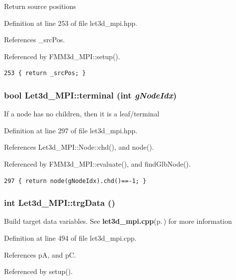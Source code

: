 Return source positions 

Definition at line 253 of file let3d\_\-mpi.hpp.

References \_\-src\-Pos.

Referenced by FMM3d\_\-MPI::setup().

\footnotesize\begin{verbatim}253 { return _srcPos; }
\end{verbatim}\normalsize 


\subsubsection{\setlength{\rightskip}{0pt plus 5cm}bool Let3d\_\-MPI::terminal (int {\em g\-Node\-Idx})\hspace{0.3cm}{\tt  [inline]}}\label{classLet3d__MPI_8bef6e640d1f466fdac02445bb2873ef_8bef6e640d1f466fdac02445bb2873ef}


If a node has no children, then it is a leaf/terminal 

Definition at line 297 of file let3d\_\-mpi.hpp.

References Let3d\_\-MPI::Node::chd(), and node().

Referenced by FMM3d\_\-MPI::evaluate(), and find\-Glb\-Node().

\footnotesize\begin{verbatim}297 { return node(gNodeIdx).chd()==-1; }
\end{verbatim}\normalsize 


\subsubsection{\setlength{\rightskip}{0pt plus 5cm}int Let3d\_\-MPI::trg\-Data ()}\label{classLet3d__MPI_ca481263feff458d83769363d3ad85f7_ca481263feff458d83769363d3ad85f7}


Build target data variables. See {\bf let3d\_\-mpi.cpp}{\rm (p.\,\pageref{let3d__mpi_8cpp})} for more information 

Definition at line 494 of file let3d\_\-mpi.cpp.

References p\-A, and p\-C.

Referenced by setup().

